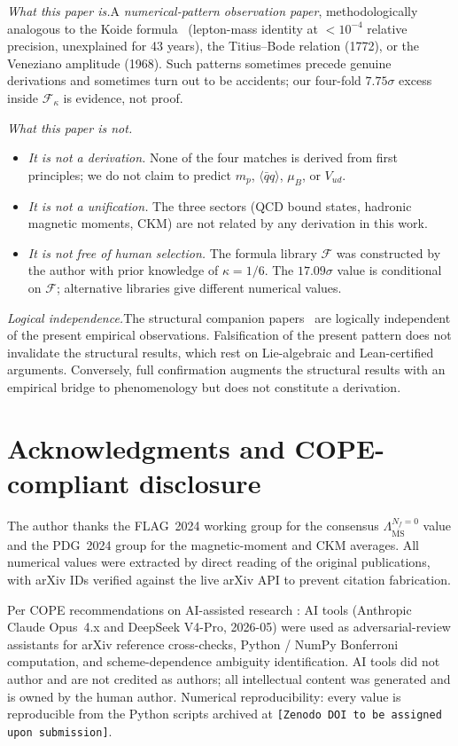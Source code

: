 \documentclass[aps,prl,reprint,amsmath,amssymb,nofootinbib,floatfix,superscriptaddress]{revtex4-2}
\newcommand{\calF}{\mathcal{F}}
\newcommand{\msbar}{\overline{\mathrm{MS}}}
\newcommand{\LambdaPG}{\Lambda^{N_f = 0}_{\msbar}}
\begin{document}
\textit{What this paper is.}\quad A \emph{numerical-pattern observation paper}, methodologically analogous to the Koide formula~\cite{Koide1983} (lepton-mass identity at $< 10^{-4}$ relative precision, unexplained for 43 years), the Titius--Bode relation (1772), or the Veneziano amplitude (1968). Such patterns sometimes precede genuine derivations and sometimes turn out to be accidents; our four-fold $7.75\sigma$ excess inside $\calF_\kappa$ is evidence, not proof.

\textit{What this paper is not.}\quad
\begin{itemize}
\item \emph{It is not a derivation.} None of the four matches is derived from first principles; we do not claim to predict $m_p$, $\langle\bar{q}q\rangle$, $\mu_B$, or $V_{ud}$.
\item \emph{It is not a unification.} The three sectors (QCD bound states, hadronic magnetic moments, CKM) are not related by any derivation in this work.
\item \emph{It is not free of human selection.} The formula library $\calF$ was constructed by the author with prior knowledge of $\kappa = 1/6$. The $17.09\sigma$ value is conditional on $\calF$; alternative libraries give different numerical values.
\end{itemize}

\textit{Logical independence.}\quad The structural companion papers~\cite{Remondiere2026a,Remondiere2026b} are logically independent of the present empirical observations. Falsification of the present pattern does not invalidate the structural results, which rest on Lie-algebraic and Lean-certified arguments. Conversely, full confirmation augments the structural results with an empirical bridge to phenomenology but does not constitute a derivation.

\section*{Acknowledgments and COPE-compliant disclosure}
\label{sec:ack}

The author thanks the FLAG~2024 working group for the consensus $\LambdaPG$ value and the PDG~2024 group for the magnetic-moment and CKM averages. All numerical values were extracted by direct reading of the original publications, with arXiv IDs verified against the live arXiv API to prevent citation fabrication.

Per COPE recommendations on AI-assisted research \cite{COPE2023}: AI tools (Anthropic Claude Opus~4.x and DeepSeek V4-Pro, 2026-05) were used as adversarial-review assistants for arXiv reference cross-checks, Python / NumPy Bonferroni computation, and scheme-dependence ambiguity identification. AI tools did not author and are not credited as authors; all intellectual content was generated and is owned by the human author. Numerical reproducibility: every value is reproducible from the Python scripts archived at \texttt{[Zenodo DOI to be assigned upon submission]}.
\end{document}
